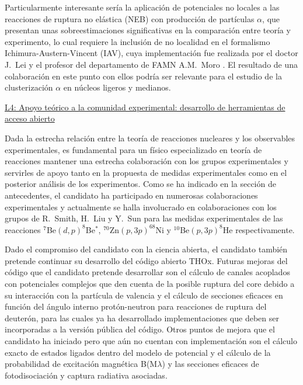 \documentclass[a4paper,12pt,twoside]{article}
\begin{document}
Particularmente interesante sería la aplicación de potenciales no locales a las reacciones de ruptura no elástica (NEB) con producción de partículas $\alpha$, que presentan unas sobreestimaciones significativas en la comparación entre teoría y experimento, lo cual requiere la inclusión de no localidad en el formalismo Ichimura-Austern-Vincent (IAV), cuya implementación fue realizada por el doctor J.~Lei y el profesor del departamento de FAMN A.M.~Moro \cite{iav}. El resultado de una colaboración en este punto con ellos podría ser relevante para el estudio de la clusterización $\alpha$ en núcleos ligeros y medianos.

\underline{L4: Apoyo teórico a la comunidad experimental:  desarrollo de herramientas de acceso abierto}

Dada la estrecha relación entre la teoría de reacciones nucleares y los observables experimentales, es fundamental para un físico especializado en teoría de reacciones mantener una estrecha colaboración con los grupos experimentales y servirles de apoyo tanto en la propuesta de medidas experimentales como en el posterior análisis de los experimentos. Como se ha indicado en la sección de antecedentes, el candidato ha participado en numerosas colaboraciones experimentales y actualmente se halla involucrado en colaboraciones con los grupos de R.~Smith, H.~Liu y Y.~Sun para las medidas experimentales de las reacciones $^7$Be$(d, p)^8$Be$^*$, $^{70}$Zn$(p,3p)^{68}$Ni y $^{10}$Be$(p,3p)^8$He respectivamente.

Dado el compromiso del candidato con la ciencia abierta, el candidato también pretende continuar su desarrollo del código abierto THOx. Futuras mejoras del código que el candidato pretende desarrollar son el cálculo de canales acoplados con potenciales complejos que den cuenta de la posible ruptura del core debido a su interacción con la partícula de valencia \cite{complexcdcc} y el cálculo de secciones eficaces en función del ángulo interno protón-neutron para reacciones de ruptura del deuterón, para las cuales ya ha desarrollado implementaciones que deben ser incorporadas a la versión pública del código. Otros puntos de mejora que el candidato ha iniciado pero que aún no cuentan con implementación son el cálculo exacto de estados ligados dentro del modelo de potencial y el cálculo de la probabilidad de excitación magnética B(M$\lambda$) y las secciones eficaces de fotodisociación y captura radiativa asociadas.
\end{document}
